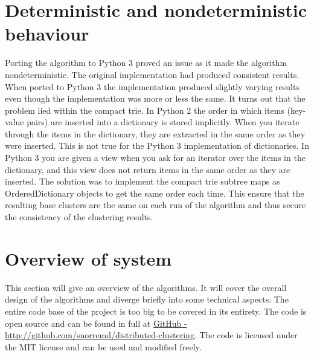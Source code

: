 \section{Deterministic and nondeterministic behaviour}
Porting the \CTC algorithm to Python 3 proved an issue as it made the algorithm nondeterministic. The original \CTC implementation had produced consistent results. When ported to Python 3 the implementation produced slightly varying results even though the implementation was more or less the same. It turns out that the problem lied within the compact trie. In Python 2 the order in which items (key-value pairs) are inserted into a dictionary is stored implicitly. When you iterate through the items in the dictionary, they are extracted in the same order as they were inserted. This is not true for the Python 3 implementation of dictionaries. In Python 3 you are given a view when you ask for an iterator over the items in the dictionary, and this view does not return items in the same order as they are inserted. The solution was to implement the compact trie subtree maps as OrderedDictionary objects to get the same order each time. This ensure that the resulting base clusters are the same on each run of the algorithm and thus secure the consistency of the clustering results.

\section{Overview of system}
This section will give an overview of the algorithms. It will cover the overall design of the algorithms and diverge briefly into some technical aspects. The entire code base of the project is too big to be covered in its entirety. The code is open source and can be found in full at \href{http://github.com/snorremd/distributed-clustering}{GitHub - http://github.com/snorremd/distributed-clustering}. The code is licensed under the MIT license and can be used and modified freely.

